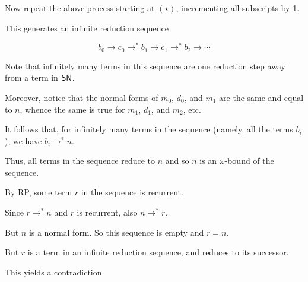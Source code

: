 \documentclass{scrartcl}
\begin{document}
\begin{itemize}
  Now repeat the above process starting at $(\star)$, incrementing all subscripts by 1.

  This generates an infinite reduction sequence

  \[b_0 \to c_0 \to^* b_1 \to c_1 \to^* b_2 \to \cdots \]

  Note that infinitely many terms in this sequence are one reduction step
  away from a term in $\mathsf{SN}$.

  Moreover, notice that the normal forms of $m_0$, $d_0$, and $m_1$ are the same
  and equal to $n$, whence the same is true for $m_1$, $d_1$, and $m_2$, etc.

  It follows that, for infinitely many terms in the sequence
  (namely, all the terms $b_i$), we have $b_i \to^* n$.

  Thus, all terms in the sequence reduce to $n$ and so $n$ is an $\omega$-bound
  of the sequence.

  By RP, some term $r$ in the sequence is recurrent.

  Since $r \to^* n$ and $r$ is recurrent, also $n \to^* r$.

  But $n$ is a normal form.  So this sequence is empty and $r=n$.

  But $r$ is a term in an infinite reduction sequence, and reduces to its successor.

  This yields a contradiction.

\end{itemize}
\end{document}
